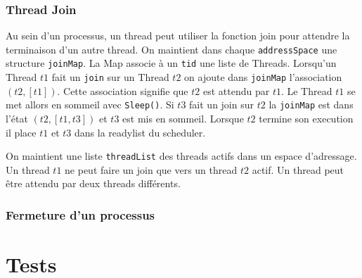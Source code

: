 \documentclass[11pt]{article}
\begin{document}
\subsubsection{Thread Join}
Au sein d'un processus, un thread peut utiliser la fonction join pour attendre la terminaison d'un autre thread.
On maintient dans chaque \texttt{addressSpace} une structure \texttt{joinMap}.
La Map associe à un \texttt{tid} une liste de Threads.
Lorsqu'un Thread $t1$ fait un \texttt{join} sur un Thread $t2$ on ajoute dans \texttt{joinMap}
l'association $(t2, [t1])$. Cette association signifie que $t2$ est attendu par $t1$.
Le Thread $t1$ se met allors en sommeil avec \texttt{Sleep()}. 
Si $t3$ fait un join sur $t2$ la \texttt{joinMap} est dans l'état $(t2, [t1,t3])$ et $t3$ est mis en sommeil.
Lorsque $t2$ termine son execution il place $t1$ et $t3$ dans la readylist du scheduler.

On maintient une liste \texttt{threadList} des threads actifs dans un espace d'adressage.
Un thread $t1$ ne peut faire un join que vers un thread $t2$ actif.
Un thread peut être attendu par deux threads différents.

\subsubsection{Fermeture d'un processus}



\section{Tests}
\end{document}
